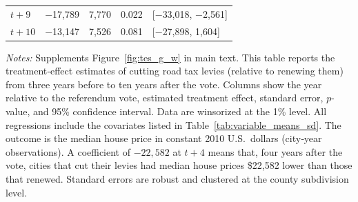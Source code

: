 \begin{table}[htbp]
\begin{threeparttable}
\begin{minipage}{\linewidth}
\begin{tabular}{p{3cm}cccl}
        $t + 9$  & $-$17,789 & 7,770  & 0.022 & [$-$33,018, $-$2,561] \\
        $t + 10$ & $-$13,147 & 7,526  & 0.081 & [$-$27,898, 1,604] \\
        \hline
    \end{tabular}
    \vspace{0.5em}
    \begin{tablenotes}[flushleft]
        \small
        \item \textit{Notes:} Supplements Figure~\ref{fig:tes_g_w} in main text. This table reports the treatment‐effect estimates of cutting road tax levies (relative to renewing them) from three years before to ten years after the vote. Columns show the year relative to the referendum vote, estimated treatment effect, standard error, \(p\)-value, and 95\% confidence interval. Data are winsorized at the 1\% level. All regressions include the covariates listed in Table~\ref{tab:variable_means_sd}. The outcome is the median house price in constant 2010 U.S.~dollars (city‐year observations). A coefficient of $-22{,}582$ at $t+4$ means that, four years after the vote, cities that cut their levies had median house prices \$22,582 lower than those that renewed. Standard errors are robust and clustered at the county subdivision level.
    \end{tablenotes}
    \end{minipage}
    \end{threeparttable}
\end{table}


